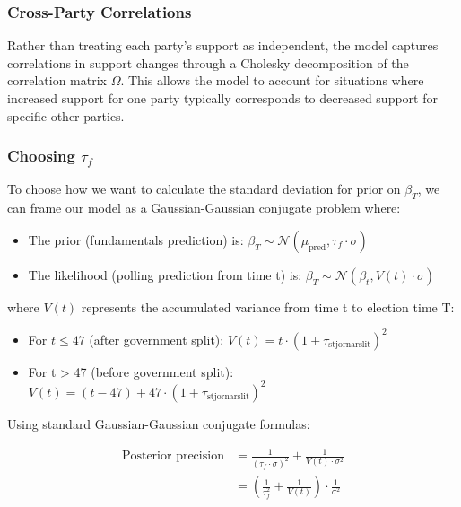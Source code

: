 \documentclass[
  letterpaper,
  DIV=11,
  numbers=noendperiod]{scrartcl}
\providecommand{\tightlist}{%
  \setlength{\itemsep}{0pt}\setlength{\parskip}{0pt}}\usepackage{longtable,booktabs,array}
\begin{document}
\subsubsection{Cross-Party
Correlations}\label{cross-party-correlations-1}

Rather than treating each party's support as independent, the model
captures correlations in support changes through a Cholesky
decomposition of the correlation matrix \(\Omega\). This allows the
model to account for situations where increased support for one party
typically corresponds to decreased support for specific other parties.

\subsubsection{\texorpdfstring{Choosing
\(\tau_f\)}{Choosing \textbackslash tau\_f}}\label{choosing-tau_f}

To choose how we want to calculate the standard deviation for prior on
\(\beta_T\), we can frame our model as a Gaussian-Gaussian conjugate
problem where:

\begin{itemize}
\tightlist
\item
  The prior (fundamentals prediction) is:
  \(\beta_T \sim \mathcal{N}(\mu_{\text{pred}}, \tau_f \cdot \sigma)\)
\item
  The likelihood (polling prediction from time t) is:
  \(\beta_T \sim \mathcal{N}(\beta_t, V(t) \cdot \sigma)\)
\end{itemize}

where \(V(t)\) represents the accumulated variance from time t to
election time T:

\begin{itemize}
\tightlist
\item
  For \(t \leq 47\) (after government split):
  \(V(t) = t \cdot (1 + \tau_{\text{stjornarslit}})^2\)
\item
  For t \textgreater{} 47 (before government split):
  \(V(t) = (t - 47) + 47 \cdot (1 + \tau_{\text{stjornarslit}})^2\)
\end{itemize}

Using standard Gaussian-Gaussian conjugate formulas:

\[
\begin{aligned}
\text{Posterior precision} &= \frac{1}{(\tau_f \cdot \sigma)^2} + \frac{1}{V(t) \cdot \sigma^2} \\
&= \left(\frac{1}{\tau_f^2} + \frac{1}{V(t)}\right) \cdot \frac{1}{\sigma^2}
\end{aligned}
\]
\end{document}
